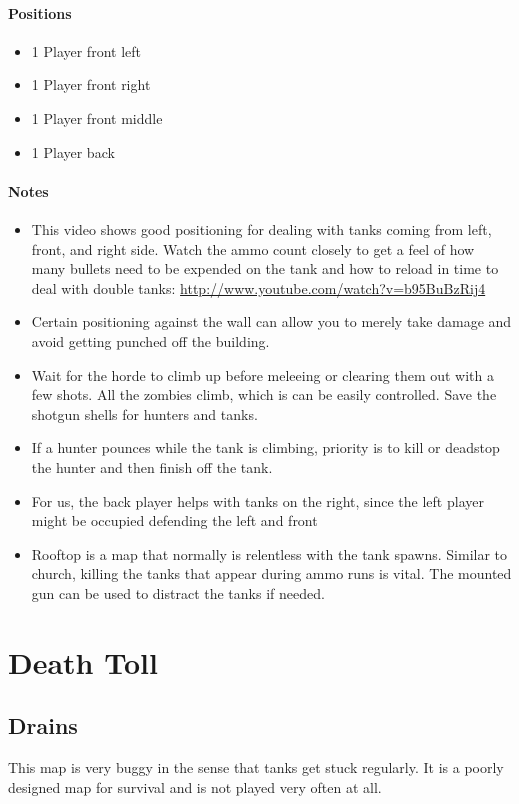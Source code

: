 \paragraph{Positions}
\begin{itemize}
\item 1 Player front left
\item 1 Player front right
\item 1 Player front middle
\item 1 Player back
\end{itemize}

\paragraph{Notes}
\begin{itemize}
\item This video shows good positioning for dealing with tanks coming from left, front, and right side. Watch the ammo count closely to get a feel of how many bullets need to be expended on the tank and how to reload in time to deal with double tanks: \url{http://www.youtube.com/watch?v=b95BuBzRij4}
\item Certain positioning against the wall can allow you to merely take damage and avoid getting punched off the building.
\item Wait for the horde to climb up before meleeing or clearing them out with a few shots. All the zombies climb, which is can be easily controlled. Save the shotgun shells for hunters and tanks.
\item If a hunter pounces while the tank is climbing, priority is to kill or deadstop the hunter and then finish off the tank.
\item For us, the back player helps with tanks on the right, since the left player might be occupied defending the left and front
\item Rooftop is a map that normally is relentless with the tank spawns. Similar to church, killing the tanks that appear during ammo runs is vital. The mounted gun can be used to distract the tanks if needed.
\end{itemize}

\section{Death Toll}

\subsection{Drains}
This map is very buggy in the sense that tanks get stuck regularly. It is a poorly designed map for survival and is not played very often at all.


